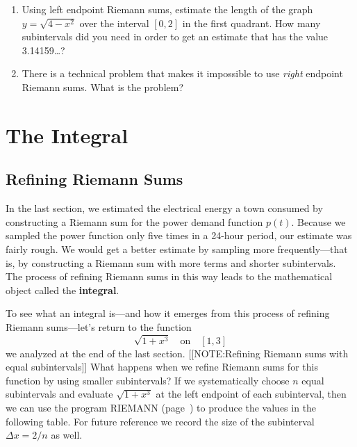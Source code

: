 \begin{enumerate}
  \begin{enumerate}
  \item Using left endpoint Riemann sums, estimate the length of the
graph $y = \sqrt{4 - x^2}$ over the interval $[0, 2]$ in the first
quadrant.  How many subintervals did you need in order to get an
estimate that has the value 3.14159\ldots ?

  \item There is a technical problem that makes it impossible to use {\em
  right\/} endpoint Riemann sums.  What is the problem?





\end{enumerate}
\end{enumerate}
\section{The Integral}
\label{sec:the-integral}

\subsection{Refining Riemann Sums}
\label{subsec:refining-riemann-sums}

\label{ref1}
	In the last section, we estimated the electrical energy a town consumed by constructing a Riemann sum for the power demand function $p(t)$.  Because we sampled the power function only five times in a 24-hour period, our estimate was fairly rough.  We would get a better estimate by sampling more frequently---that is, by constructing a Riemann sum with more terms and shorter subintervals.  The process of refining Riemann sums in this way leads to the mathematical object called the {\bf integral}.

To see what an integral is---and how it emerges from this process of
refining Riemann sums---let's return to the function
\[
\sqrt{1 + x^3} \quad \mbox{on} \quad [1,3] 
\]
we analyzed at the end of the last section.  
[[NOTE:Refining Riemann sums with equal subintervals]]
What happens when we refine Riemann sums for this function by using
smaller subintervals?  If we systematically choose $n$ equal
subintervals and evaluate $\sqrt{1 + x^3}$ at the left endpoint of
each subinterval, then we can use the program RIEMANN
(page~\pageref{program RIEMANN}) to produce the values in the
following table.  For future reference we record the size of the
subinterval $\Delta x = 2/n$ as well.

